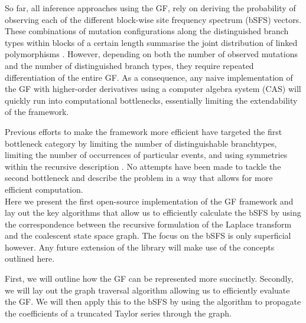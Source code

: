 \documentclass[10pt, a4]{article}
\begin{document}
So far, all inference approaches using the GF, rely on deriving the probability of observing each of the different block-wise site frequency spectrum (bSFS) vectors. These combinations of mutation configurations along the distinguished branch types within blocks of a certain length summarise the joint distribution of linked polymorphisms \citep{Bunnefeld2015}. However, depending on both the number of observed mutations and the number of distinguished branch types, they require repeated differentiation of the entire GF. As a consequence, any naive implementation of the GF with higher-order derivatives using a computer algebra system (CAS) will quickly run into computational bottlenecks, essentially limiting the extendability of the framework.

Previous efforts to make the framework more efficient have targeted the first bottleneck category by limiting the number of distinguishable branchtypes, limiting the number of occurrences of particular events, and using symmetries within the recursive description \citep{Lohse2016}. No attempts have been made to tackle the second bottleneck and describe the problem in a way that allows for more efficient computation.\\

Here we present the first open-source implementation of the GF framework and lay out the key algorithms that allow us to efficiently calculate the bSFS by using the correspondence between the recursive formulation of the Laplace transform and the coalescent state space graph. The focus on the bSFS is only superficial however. Any future extension of the library will make use of the concepts outlined here.

First, we will outline how the GF can be represented more succinctly. Secondly, we will lay out the graph traversal algorithm allowing us to efficiently evaluate the GF. We will then apply this to the bSFS by using the algorithm to propagate the coefficients of a truncated Taylor series through the graph.
\end{document}
